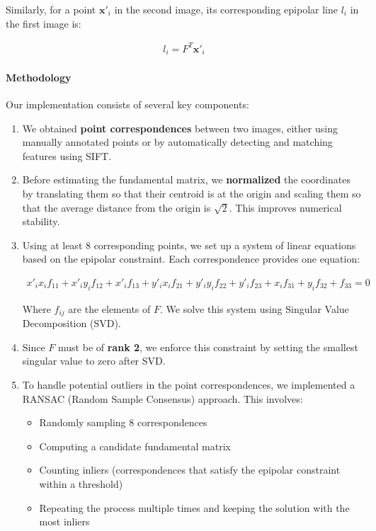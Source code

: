Similarly, for a point $\mathbf{x}'_i$ in the second image, its corresponding epipolar line $l_i$ in the first image is:

\begin{align*}
l_i = F^T \mathbf{x}'_i
\end{align*}

\paragraph{Methodology} Our implementation consists of several key components:

\begin{enumerate}
\item We obtained \textbf{point correspondences} between two images, either using manually annotated points or by automatically detecting and matching features using SIFT.
\item Before estimating the fundamental matrix, we \textbf{normalized} the coordinates by translating them so that their centroid is at the origin and scaling them so that the average distance from the origin is $\sqrt{2}$. This improves numerical stability.

\item Using at least 8 corresponding points, we set up a system of linear equations based on the epipolar constraint. Each correspondence provides one equation:

\begin{align*}
    x'_i x_i f_{11} + x'_i y_i f_{12} + x'_i f_{13} + y'_i x_i f_{21} + y'_i y_i f_{22} + y'_i f_{23} + x_i f_{31} + y_i f_{32} + f_{33} = 0
\end{align*}

Where $f_{ij}$ are the elements of $F$. We solve this system using Singular Value Decomposition (SVD).

\item Since $F$ must be of \textbf{rank 2}, we enforce this constraint by setting the smallest singular value to zero after SVD.

\item To handle potential outliers in the point correspondences, we implemented a RANSAC (Random Sample Consensus) approach. This involves:

\begin{itemize}
    \item Randomly sampling 8 correspondences
    \item Computing a candidate fundamental matrix
    \item Counting inliers (correspondences that satisfy the epipolar constraint within a threshold)
    \item Repeating the process multiple times and keeping the solution with the most inliers
\end{itemize}


\end{enumerate}
